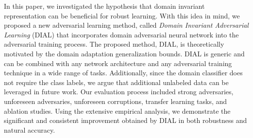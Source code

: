 In this paper, we investigated the hypothesis that domain invariant representation can be beneficial for robust learning. With this idea in mind, we proposed a new adversarial learning method, called \textit{Domain Invariant Adversarial Learning} (DIAL) that incorporates domain adversarial neural network into the adversarial training process.
The proposed method, DIAL, is theoretically motivated by the domain adaptation generalization bounds.
DIAL is generic and can be combined with any network architecture and any adversarial training technique in a wide range of tasks. Additionally, since the domain classifier does not require the class labels, we argue that additional unlabeled data can be leveraged in future work. Our evaluation process included strong adversaries, unforeseen adversaries, unforeseen corruptions, transfer learning tasks, and ablation studies. Using the extensive empirical analysis, we demonstrate the significant and consistent improvement obtained by DIAL in both robustness and natural accuracy. 
